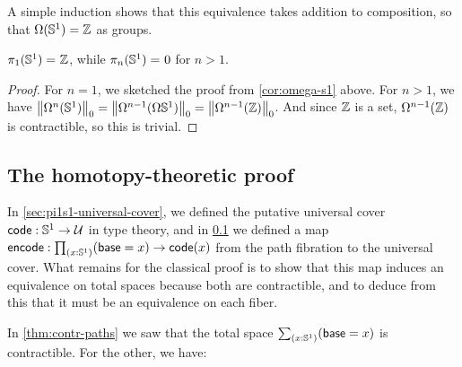 A simple induction shows that this equivalence takes addition to
composition, so that $\Omega(\Sn ^1) = \Z$ as groups.

\begin{cor} \label{cor:pi1s1}
$\id{\pi_1(\Sn ^1)} {\Z}$, while $\id{\pi_n(\Sn ^1)}0$ for $n>1$.
\end{cor}
\begin{proof}
For $n=1$, we sketched the proof from \cref{cor:omega-s1} above.
For $n > 1$, we have $\trunc 0 {\Omega^{n}(\Sn ^1)} = \trunc 0 {\Omega^{n-1}(\Omega{\Sn ^1})} = \trunc 0 {\Omega^{n-1}(\Z)}$.
And since $\Z$ is a set, $\Omega^{n-1}(\Z)$ is contractible, so this is trivial.
\end{proof}

%


\subsection{The homotopy-theoretic proof}
\label{subsec:pi1s1-homotopy-theory}

In \cref{sec:pi1s1-universal-cover}, we defined the putative universal cover $\code:\Sn^1\to\type$ in type theory, and in \cref{subsec:pi1s1-homotopy-theory} we defined a map $\encode : \prd{x:\Sn^1} (\base=x) \to \code(x)$ from the path fibration to the universal cover.
What remains for the classical proof is to show that this map induces an equivalence on total spaces because both are contractible, and to deduce from this that it must be an equivalence on each fiber.

%
In \cref{thm:contr-paths} we saw that the total space $\sm{x:\Sn^1} (\base=x)$ is contractible.
For the other, we have:

